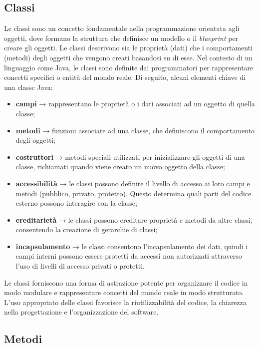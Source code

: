 \subsection{Classi}

Le classi sono un concetto fondamentale nella programmazione orientata agli oggetti, dove formano la struttura che definisce un modello o il \textit{blueprint} per creare gli oggetti. Le classi descrivono sia le proprietà (dati) che i comportamenti (metodi) degli oggetti che vengono creati basandosi su di esse.
Nel contesto di un linguaggio come Java, le classi sono definite dai programmatori per rappresentare concetti specifici o entità del mondo reale. Di seguito, alcuni elementi chiave di una classe Java:
\begin{itemize}
    \item \textbf{campi} → rappresentano le proprietà o i dati associati ad un oggetto di quella classe;
    \item \textbf{metodi} → funzioni associate ad una classe, che definiscono il comportamento degli oggetti;
    \item \textbf{costruttori} → metodi speciali utilizzati per inizializzare gli oggetti di una classe, richiamati quando viene creato un nuovo oggetto della classe;
    \item \textbf{accessibilità} → le classi possono definire il livello di accesso ai loro campi e metodi (pubblico, privato, protetto). Questo determina quali parti del codice esterno possono interagire con la classe;
    \item \textbf{ereditarietà} → le classi possono ereditare proprietà e metodi da altre classi, consentendo la creazione di gerarchie di classi;
    \item \textbf{incapsulamento} → le classi consentono l’incapsulamento dei dati, quindi i campi interni possono essere protetti da accessi non autorizzati attraverso l’uso di livelli di accesso privati o protetti.
\end{itemize}
Le classi forniscono una forma di astrazione potente per organizzare il codice in modo modulare e rappresentare concetti del mondo reale in modo strutturato. L’uso appropriato delle classi favorisce la riutilizzabilità del codice, la chiarezza nella progettazione e l’organizzazione del software.\cite{JAVA_educative}\cite{JAVA_w3schools}

\subsection{Metodi}

